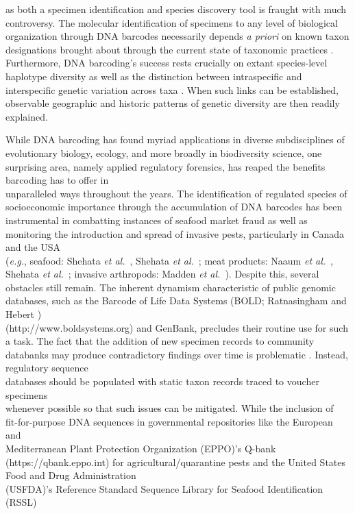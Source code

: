as both a specimen identification and species discovery tool is fraught with much controversy. The molecular identification of specimens to any level of biological organization through DNA barcodes necessarily depends \textit{a priori} on known taxon designations brought about through the current state of taxonomic practices \cite{desalle2006species}. \\ Furthermore, DNA barcoding's success rests crucially on extant species-level haplotype diversity as well as the distinction between intraspecific and interspecific genetic variation across taxa \cite{phillips2019incomplete}. When such links can be established, observable geographic and historic patterns of genetic diversity are then readily explained.



While DNA barcoding has found myriad applications in diverse subdisciplines of \\ evolutionary biology, ecology, and more broadly in biodiversity science, one surprising area, namely applied regulatory forensics, has reaped the benefits barcoding has to offer in \\ unparalleled ways throughout the years. The identification of regulated species of \\ socioeconomic importance through the accumulation of DNA barcodes has been \\ instrumental in combatting instances of seafood market fraud as well as monitoring the introduction and spread of invasive pests, particularly in Canada and the USA \\ (\textit{e.g.}, seafood: Shehata \textit{et al.}~\cite{shehata2018dna}, Shehata \textit{et al.}~\cite{shehata2019survey}; meat products: Naaum \textit{et al.}~\cite{naaum2018complementary}, Shehata \textit{et al.}~\cite{shehata2019revisiting}; invasive arthropods: Madden \textit{et al.}~\cite{madden2019using}). Despite this, several obstacles still remain. The inherent dynamism characteristic of public genomic databases, such as the Barcode of Life Data Systems (BOLD; Ratnasingham and Hebert \cite{ratnasingham2007bold}) \\ (http://www.boldsystems.org) and GenBank, precludes their routine use for such a task. The fact that the addition of new specimen records to community databanks may produce contradictory findings over time is problematic \cite{phillips2020hacsim}. Instead, regulatory sequence \\ databases should be populated with static taxon records traced to voucher specimens \\ whenever possible so that such issues can be mitigated. While the inclusion of \\ fit-for-purpose DNA sequences in governmental repositories like the European and \\ Mediterranean Plant Protection Organization (EPPO)'s Q-bank (https://qbank.eppo.int) for agricultural/quarantine pests and the United States Food and Drug Administration \\ (USFDA)'s Reference Standard Sequence Library for Seafood Identification (RSSL) \\ 